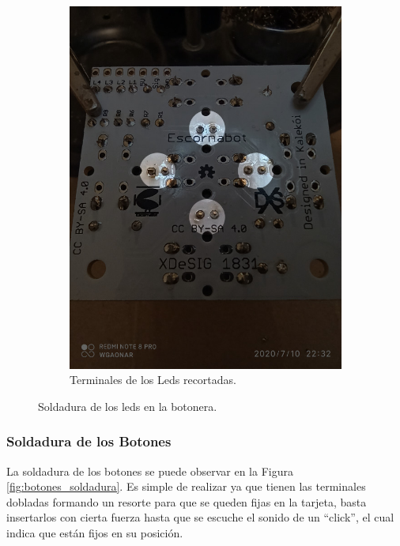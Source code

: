 \documentclass{article}
\begin{document}
\begin{figure}[H]
\begin{subfigure}[t]{0.3\textwidth}
        \includegraphics[width=0.9\columnwidth, height=1.2\columnwidth]{images/Botonera/led4.jpg}
        \caption{Terminales de los Leds recortadas.}
        \label{fig:botonera_led4}
    \end{subfigure}
    \caption{Soldadura de los leds en la botonera.}
    \label{fig:botonera_leds}
\end{figure}

\subsubsection{Soldadura de los Botones}
La soldadura de los botones se puede observar en la Figura \ref{fig:botones_soldadura}. Es simple de realizar ya que tienen las terminales dobladas formando un resorte para que se queden fijas en la tarjeta, basta insertarlos con cierta fuerza hasta que se escuche el sonido de un “click”, el cual indica que están fijos en su posición. 
\end{document}

